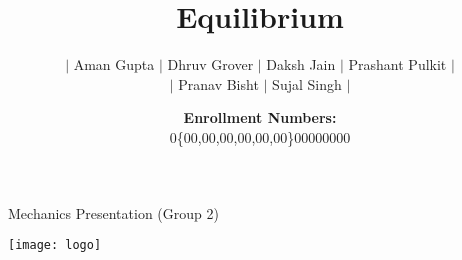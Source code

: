 \documentclass[11pt]{beamer}
\title{Equilibrium}
\author[Aman, Dhruv, Daksh...]
{\(|\) Aman Gupta \(|\) Dhruv Grover \(|\) Daksh Jain \(|\) Prashant Pulkit \(|\)\\
    \(|\) Pranav Bisht \(|\) Sujal Singh \(|\)}
\date[Prashant, Pranav, Sujal]{\textbf{Enrollment Numbers:}\\0\{00,00,00,00,00,00\}00000000}
\newcommand{\0}{\footnotesize}
\begin{document}
    \begin{frame}{Mechanics Presentation (Group 2)}
        \begin{center}
            \texttt{[image: logo]}
        \end{center}\vspace*{-10pt}
        \maketitle
    \end{frame}

%
%
%
%
\end{document}
